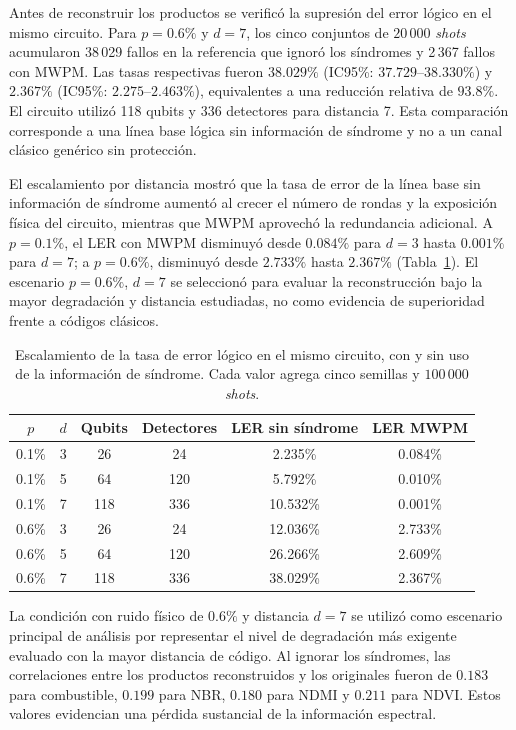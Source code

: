 \documentclass[fleqn,10pt]{wlscirep}
\begin{document}
Antes de reconstruir los productos se verificó la supresión del error lógico en el mismo circuito. Para $p=0.6\%$ y $d=7$, los cinco conjuntos de $20\,000$ \textit{shots} acumularon 38\,029 fallos en la referencia que ignoró los síndromes y 2\,367 fallos con MWPM. Las tasas respectivas fueron $38.029\%$ (IC95\%: $37.729$--$38.330\%$) y $2.367\%$ (IC95\%: $2.275$--$2.463\%$), equivalentes a una reducción relativa de $93.8\%$. El circuito utilizó 118 qubits y 336 detectores para distancia 7. Esta comparación corresponde a una línea base lógica sin información de síndrome y no a un canal clásico genérico sin protección.

El escalamiento por distancia mostró que la tasa de error de la línea base sin información de síndrome aumentó al crecer el número de rondas y la exposición física del circuito, mientras que MWPM aprovechó la redundancia adicional. A $p=0.1\%$, el LER con MWPM disminuyó desde $0.084\%$ para $d=3$ hasta $0.001\%$ para $d=7$; a $p=0.6\%$, disminuyó desde $2.733\%$ hasta $2.367\%$ (Tabla~\ref{tab:ler_escalamiento}). El escenario $p=0.6\%$, $d=7$ se seleccionó para evaluar la reconstrucción bajo la mayor degradación y distancia estudiadas, no como evidencia de superioridad frente a códigos clásicos.

\begin{table}[H]
\centering
\caption{Escalamiento de la tasa de error lógico en el mismo circuito, con y sin uso de la información de síndrome. Cada valor agrega cinco semillas y $100\,000$ \textit{shots}.}
\label{tab:ler_escalamiento}
\scriptsize
\setlength{\tabcolsep}{5pt}
\begin{tabular}{cccccc}
\toprule
\textbf{$p$} & \textbf{$d$} & \textbf{Qubits} & \textbf{Detectores} & \textbf{LER sin síndrome} & \textbf{LER MWPM} \\
\midrule
0.1\% & 3 & 26  & 24  & 2.235\%  & 0.084\% \\
0.1\% & 5 & 64  & 120 & 5.792\%  & 0.010\% \\
0.1\% & 7 & 118 & 336 & 10.532\% & 0.001\% \\
0.6\% & 3 & 26  & 24  & 12.036\% & 2.733\% \\
0.6\% & 5 & 64  & 120 & 26.266\% & 2.609\% \\
0.6\% & 7 & 118 & 336 & 38.029\% & 2.367\% \\
\bottomrule
\end{tabular}
\end{table}

La condición con ruido físico de $0.6\%$ y distancia $d=7$ se utilizó
como escenario principal de análisis por representar el nivel de
degradación más exigente evaluado con la mayor distancia de código. Al
ignorar los síndromes, las correlaciones entre los productos
reconstruidos y los originales fueron de $0.183$ para combustible,
$0.199$ para NBR, $0.180$ para NDMI y $0.211$ para NDVI. Estos valores
evidencian una pérdida sustancial de la información espectral.
\end{document}
